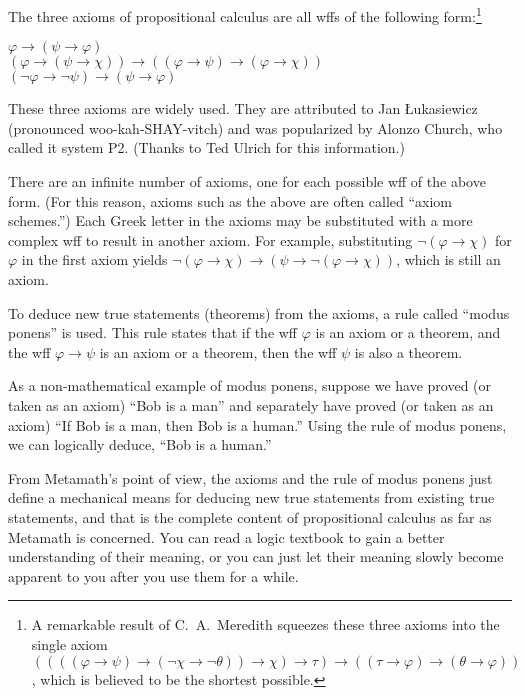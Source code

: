 The three axioms of propositional calculus are all wffs of the following form:\footnote{A remarkable result of
C.~A.~Meredith squeezes these three axioms into the
single axiom $((((\varphi\rightarrow \psi)\rightarrow(\neg \chi\rightarrow\neg
\theta))\rightarrow \chi )\rightarrow \tau)\rightarrow((\tau\rightarrow
\varphi)\rightarrow(\theta\rightarrow \varphi))$ \cite{CAMeredith},
which is believed to be the shortest possible.}
\begin{center}
     $\varphi\rightarrow(\psi\rightarrow \varphi)$\\

     $(\varphi\rightarrow (\psi\rightarrow \chi))\rightarrow
((\varphi\rightarrow  \psi)\rightarrow (\varphi\rightarrow \chi))$\\

     $(\neg \varphi\rightarrow \neg\psi)\rightarrow (\psi\rightarrow
\varphi)$
\end{center}

These three axioms are widely used.
They are attributed to Jan {\L}ukasiewicz
(pronounced woo-kah-SHAY-vitch) and was popularized by Alonzo Church,
who called it system P2. (Thanks to Ted Ulrich for this information.)

There are an infinite number of axioms, one for each possible
wff of the above form.  (For this reason,
axioms such as the above are often called ``axiom schemes.'')  Each Greek letter in the axioms may be substituted with a more
complex wff to result in another axiom.  For example, substituting
$\neg(\varphi\rightarrow\chi)$ for $\varphi$ in the first axiom yields
$\neg(\varphi\rightarrow\chi)\rightarrow(\psi\rightarrow
\neg(\varphi\rightarrow\chi))$, which is still an axiom.

To deduce new true statements (theorems) from the axioms, a
rule called ``modus ponens'' is used.  This
rule states that if the wff $\varphi$ is an axiom or a theorem, and the wff
$\varphi\rightarrow\psi$ is an axiom or a theorem, then the wff $\psi$ is also
a theorem.

As a non-mathematical example of modus ponens, suppose we have proved (or
taken as an axiom) ``Bob is a man'' and separately have proved (or taken as
an axiom) ``If Bob is a man, then Bob is a human.''  Using the rule of modus
ponens, we can logically deduce, ``Bob is a human.''

From Metamath's point of view, the axioms and the rule of
modus ponens just define a mechanical means for deducing new true statements
from existing true statements, and that is the complete content of
propositional calculus as far as Metamath is concerned.  You can read a logic
textbook to gain a better understanding of their meaning, or you can just let
their meaning slowly become apparent to you after you use them for a while.

